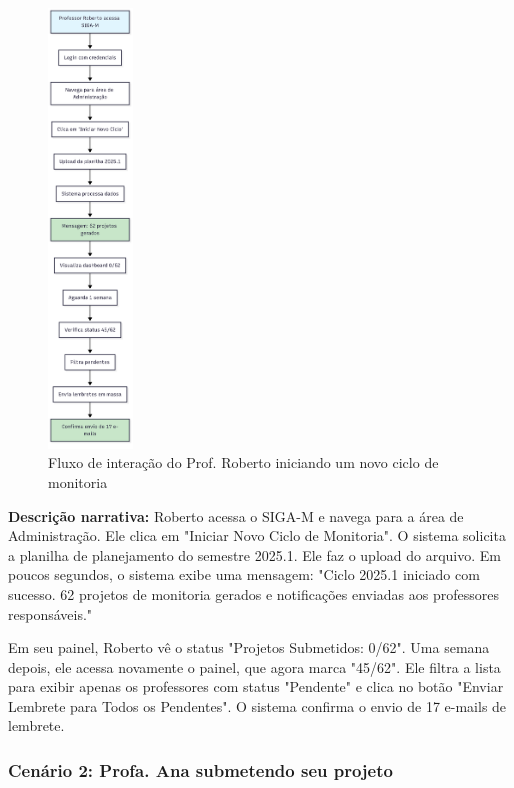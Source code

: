 \documentclass[12pt, a4paper]{report}
\begin{document}
\begin{figure}[H]
\centering
\includegraphics[width=0.2\textwidth]{roberto.png}
\caption{Fluxo de interação do Prof. Roberto iniciando um novo ciclo de monitoria}
\label{fig:cenario-roberto}
\end{figure}

\textbf{Descrição narrativa:}
Roberto acessa o SIGA-M e navega para a área de Administração. Ele clica em "Iniciar Novo Ciclo de Monitoria". O sistema solicita a planilha de planejamento do semestre 2025.1. Ele faz o upload do arquivo. Em poucos segundos, o sistema exibe uma mensagem: "Ciclo 2025.1 iniciado com sucesso. 62 projetos de monitoria gerados e notificações enviadas aos professores responsáveis."

Em seu painel, Roberto vê o status "Projetos Submetidos: 0/62". Uma semana depois, ele acessa novamente o painel, que agora marca "45/62". Ele filtra a lista para exibir apenas os professores com status "Pendente" e clica no botão "Enviar Lembrete para Todos os Pendentes". O sistema confirma o envio de 17 e-mails de lembrete.

\subsubsection{Cenário 2: Profa. Ana submetendo seu projeto}
\end{document}
